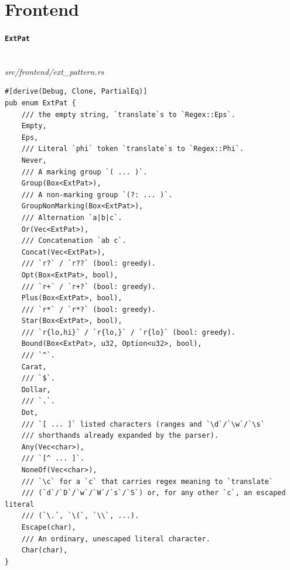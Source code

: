 \section{Frontend}
\label{app:code-frontend}

\paragraph{\texttt{ExtPat}}\ \\[-0.4em]
\textit{\small src/frontend/ext\_pattern.rs}
{\scriptsize\begin{verbatim}
#[derive(Debug, Clone, PartialEq)]
pub enum ExtPat {
    /// the empty string, `translate`s to `Regex::Eps`.
    Empty,
    Eps,
    /// Literal `phi` token `translate`s to `Regex::Phi`.
    Never,
    /// A marking group `( ... )`.
    Group(Box<ExtPat>),
    /// A non-marking group `(?: ... )`.
    GroupNonMarking(Box<ExtPat>),
    /// Alternation `a|b|c`.
    Or(Vec<ExtPat>),
    /// Concatenation `ab c`.
    Concat(Vec<ExtPat>),
    /// `r?` / `r??` (bool: greedy).
    Opt(Box<ExtPat>, bool),
    /// `r+` / `r+?` (bool: greedy).
    Plus(Box<ExtPat>, bool),
    /// `r*` / `r*?` (bool: greedy).
    Star(Box<ExtPat>, bool),
    /// `r{lo,hi}` / `r{lo,}` / `r{lo}` (bool: greedy).
    Bound(Box<ExtPat>, u32, Option<u32>, bool),
    /// `^`.
    Carat,
    /// `$`.
    Dollar,
    /// `.`.
    Dot,
    /// `[ ... ]` listed characters (ranges and `\d`/`\w`/`\s`
    /// shorthands already expanded by the parser).
    Any(Vec<char>),
    /// `[^ ... ]`.
    NoneOf(Vec<char>),
    /// `\c` for a `c` that carries regex meaning to `translate`
    /// (`d`/`D`/`w`/`W`/`s`/`S`) or, for any other `c`, an escaped literal
    /// (`\.`, `\(`, `\\`, ...).
    Escape(char),
    /// An ordinary, unescaped literal character.
    Char(char),
}
\end{verbatim}}


